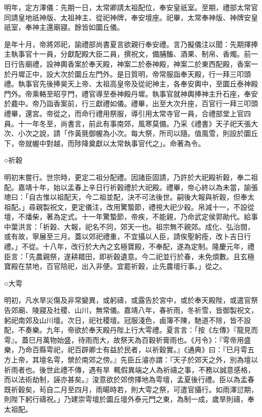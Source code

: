 明年，定方澤儀：先期一日，太常卿請太祖配位，奉安皇祇室。至期，禮部太常官同請皇地祇神版、太祖神主、從祀神牌，奉安壇座。祀畢，太常奉神版、神牌安皇祇室，奉神主還廟寢。餘皆如圜丘儀。

是年十月，帝將郊祀，諭禮部尚書夏言欲親行奉安禮。言乃擬儀注以聞：先期擇捧主執事官十一員，分獻配殿大臣二員，撰祝文，備脯醢、酒果、制帛、香燭。前一日行告廟禮，設神輿香案於奉天殿，神案二於泰神殿，神案二於東西配殿，香案一於丹墀正中，設大次於圜丘左門外。是日質明，帝常服詣奉天殿，行一拜三叩頭禮。執事官先後捧昊天上帝、太祖高皇帝及從祀神主，各奉安輿中，至圜丘泰神殿門外。帝乘輅至昭亨門，禮官導至泰神殿丹墀。執事官就神輿捧神主升石座，奉安於龕中。帝乃詣香案前，行三獻禮如儀。禮畢，出至大次升座，百官行一拜三叩頭禮畢，還宮。帝從之，而命行禮用祭服，導引用太常寺官一員，合禮部堂上官四員。十一年冬至，尚書言，前此有事南郊，風寒莫備。乃采《禮書》天子祀天張大次、小次之說，請「作黃氈御幄為小次。每大祭，所司以隨。值風雪，則設於圜丘下，帝就幄中對越，而陟降奠獻以太常執事官代之」。命著為令。

○祈穀

明初末嘗行。世宗時，更定二祖分配禮。因諸臣固請，乃許於大祀殿祈穀，奉二祖配。嘉靖十年，始以孟春上辛日行祈穀禮於大祀殿。禮畢，帝心終以為未當，諭張璁曰：「自古惟以祖配天，今二祖並配，決不可法後世。嗣後大報與祈穀，但奉太祖配。」尋親製祝文，更定儀注，改用驚蟄節，禮視大祀少殺。帛減十一，不設從壇，不燔柴，著為定式。十一年驚蟄節，帝疾，不能親，乃命武定侯郭勛代。給事中葉洪言：「祈穀、大報，祀名不同，郊天一也。祖宗無不親郊。成化、弘治間，或有故，寧展至三月。蓋以郊祀禮重，不宜攝以人臣，請俟聖躬痊，改卜吉日行禮。」不從。十八年，改行於大內之玄極寶殿，不奉配，遂為定制。隆慶元年，禮臣言：「先農親祭，遂耕耤田，即祈穀遺意。今二祀並行於春，未免煩數。且玄極寶殿在禁地，百官陪祀，出入非便。宜罷祈穀，止先農壇行事。」從之。

○大雩

明初，凡水旱災傷及非常變異，或躬禱，或露告於宮中，或於奉天殿陛，或遣官祭告郊廟、陵寢及社稷、山川，無常儀。嘉靖八年，春祈雨，冬祈雪，皆御製祝文，躬祀南郊及山川壇。次日，祀社稷壇。冠服淺色，鹵簿不陳，馳道不除，皆不設配，不奏樂。九年，帝欲於奉天殿丹陛上行大雩禮。夏言言：「按《左傳》『龍見而雩』。蓋巳月萬物始盛，待雨而大，故祭天為百穀祈膏雨也。《月令》：『雩帝用盛樂，乃命百縣雩祀，祀百辟卿士有益於民者，以祈穀實。』《通典》曰：『巳月雩五方上帝，其壇名雩，禜於南郊之傍。』先臣丘濬亦謂：『天子於郊天之外，別為壇以祈雨者也。後世此禮不傳，遇有旱，輒假異端之人為祈禱之事，不務以誠意感格，而以法術劫制，誣亦甚矣。』浚意欲於郊傍擇地為雩壇，孟夏後行禮。臣以為孟春既祈穀矣，茍自二月至四月，雨暘時若，則大雩之祭，可遣官攝行。如雨澤愆期，則陛下躬行禱祝。」乃建崇雩壇於圜丘壇外泰元門之東，為制一成，歲旱則禱，奉太祖配。

